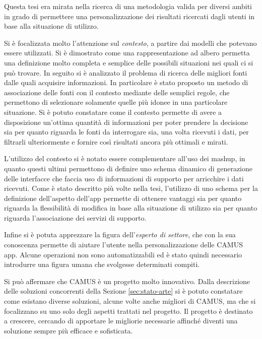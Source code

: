 Questa tesi era mirata nella ricerca di una metodologia valida per diversi ambiti in grado di permettere una personalizzazione dei risultati ricercati dagli utenti in base alla situazione di utilizzo.

Si è focalizzata molto l'attenzione sul \emph{contesto}, a partire dai modelli che potevano essere utilizzati. Si è dimostrato come una rappresentazione ad albero permetta una definizione molto completa e semplice delle possibili situazioni nei quali ci si può trovare. In seguito si è analizzato il problema di ricerca delle migliori fonti dalle quali acquisire informazioni. In particolare è stato proposto un metodo di associazione delle fonti con il contesto mediante delle semplici regole, che permettono di selezionare solamente quelle più idonee in una particolare situazione. Si è potuto constatare come il contesto permette di avere a disposizione un'ottima quantità di informazioni per poter prendere la decisione sia per quanto riguarda le fonti da interrogare sia, una volta ricevuti i dati, per filtrarli ulteriormente e fornire così risultati ancora più ottimali e mirati.

L'utilizzo del contesto si è notato essere complementare all'uso dei mashup, in quanto questi ultimi permettono di definire uno schema dinamico di generazione delle interfacce che faccia uso di informazioni di supporto per arricchire i dati ricevuti. Come è stato descritto più volte nella tesi, l'utilizzo di uno schema per la definizione dell'aspetto dell'app permette di ottenere vantaggi sia per quanto riguarda la flessibilità di modifica in base alla situazione di utilizzo sia per quanto riguarda l'associazione dei servizi di supporto.

Infine si è potuta apprezzare la figura dell'\emph{esperto di settore}, che con la sua conoscenza permette di aiutare l'utente nella personalizzazione delle CAMUS app. Alcune operazioni non sono automatizzabili ed è stato quindi necessario introdurre una figura umana che svolgesse determinati compiti.

Si può affermare che CAMUS è un progetto molto innovativo. Dalla descrizione delle soluzioni concorrenti della Sezione \ref{sec:stato-arte} si è potuto constatare come esistano diverse soluzioni, alcune volte anche migliori di CAMUS, ma che si focalizzano su uno solo degli aspetti trattati nel progetto. Il progetto è destinato a crescere, cercando di apportare le migliorie necessarie affinché diventi una soluzione sempre più efficace e sofisticata.

